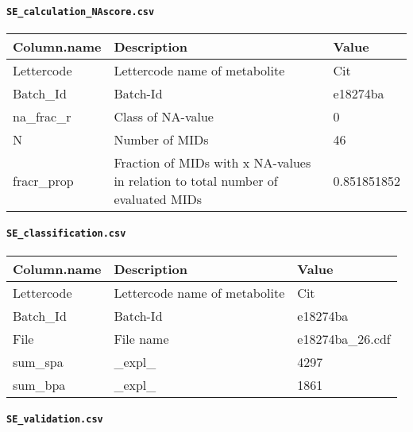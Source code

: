 \documentclass[]{book}
\let\oldparagraph\paragraph
\renewcommand{\paragraph}[1]{\oldparagraph{#1}\mbox{}}
\begin{document}
\hypertarget{se_calculation_nascore.csv}{%
\paragraph{\texorpdfstring{\texttt{SE\_calculation\_NAscore.csv}}{SE\_calculation\_NAscore.csv}}\label{se_calculation_nascore.csv}}

\begin{tabu} to 
\toprule
Column.name & Description & Value\\
\midrule
{}  Lettercode & Lettercode name of metabolite & Cit\\
Batch\_Id & Batch-Id & e18274ba\\
  na\_frac\_r & Class of NA-value & 0\\
N & Number of MIDs & 46\\
  fracr\_prop & Fraction of MIDs with x NA-values in relation to total number of evaluated MIDs & 0.851851852\\
\bottomrule
\end{tabu}

\hypertarget{se_classification.csv}{%
\paragraph{\texorpdfstring{\texttt{SE\_classification.csv}}{SE\_classification.csv}}\label{se_classification.csv}}

\begin{tabu} to 
\toprule
Column.name & Description & Value\\
\midrule
{}  Lettercode & Lettercode name of metabolite & Cit\\
Batch\_Id & Batch-Id & e18274ba\\
  File & File name & e18274ba\_26.cdf\\
sum\_spa & \_expl\_ & 4297\\
  sum\_bpa & \_expl\_ & 1861\\
\bottomrule
\end{tabu}

\hypertarget{se_validation.csv}{%
\paragraph{\texorpdfstring{\texttt{SE\_validation.csv}}{SE\_validation.csv}}\label{se_validation.csv}}
\end{document}
